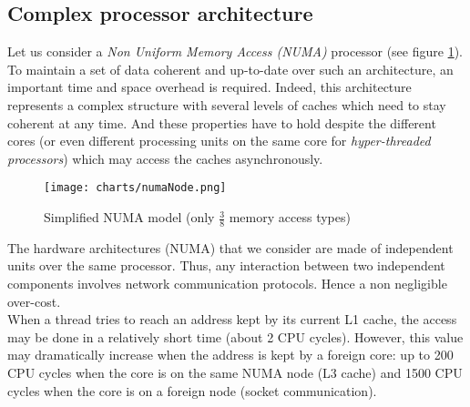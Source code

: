 \documentclass[10pt]{article}											%
\begin{document}

\subsection{Complex processor architecture}
Let us consider a \textit{Non Uniform Memory Access (NUMA)} processor (see figure \ref{globalNumaArchitecture.png}).   To maintain a set of data coherent and up-to-date over such an architecture, an important time and space overhead is required.   Indeed, this architecture represents a complex structure with several levels of caches which need to stay coherent at any time.   And these properties have to hold despite the different cores (or even different processing units on the same core for \textit{hyper-threaded processors}) which may access the caches asynchronously.\\

	\begin{figure}
		\texttt{[image: charts/numaNode.png]}
		\caption{Simplified NUMA model (only $\frac{3}{8}$ memory access types)}
        \label{globalNumaArchitecture.png}
	\end{figure}

The hardware architectures (NUMA) that we consider are made of independent units over the same processor.   Thus, any interaction between two independent components involves network communication protocols.  Hence a non negligible over-cost.\\
When a thread tries to reach an address kept by its current L1 cache, the access may be done in a relatively short time (about 2 CPU cycles).   However, this value may dramatically increase when the address is kept by a foreign core:  up to 200 CPU cycles when the core is on the same NUMA node (L3 cache) and 1500 CPU cycles when the core is on a foreign node (socket communication).


\end{document}
